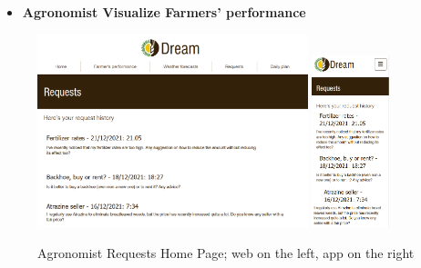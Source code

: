 \documentclass{article}
\begin{document}
    
    \begin{itemize}
        \item \textbf{Agronomist Visualize Farmers' performance}
    \end{itemize}
        \begin{figure} [h]
            \centering
            \includegraphics[width=0.7\textwidth]{images/UserInterfaces/Agronomist/Requests/RequestsWeb.png}
            \quad
            \includegraphics[width=0.2\textwidth]{images/UserInterfaces/Agronomist/Requests/RequestsApp.png}
            \quad
            \caption{\label{fig:agronomistRequests}Agronomist Requests Home Page; web on the left, app on the right}
        \end{figure}
        \newpage
\end{document}

